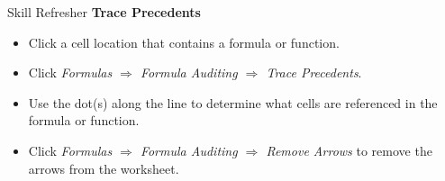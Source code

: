 \begin{center}
	\begin{sklbox}{Skill Refresher}
		\textbf{Trace Precedents}
		\\
		\begin{itemize}
			\setlength{\itemsep}{0pt}
			\setlength{\parskip}{0pt}
			\setlength{\parsep}{0pt}
			
			\item Click a cell location that contains a formula or function.
			\item Click \textit{Formulas $ \Rightarrow $ Formula Auditing $ \Rightarrow $ Trace Precedents}.
			\item Use the dot(s) along the line to determine what cells are referenced in the formula or function.
			\item Click \textit{Formulas $ \Rightarrow $ Formula Auditing $ \Rightarrow $ Remove Arrows} to remove the arrows from the worksheet.
			
		\end{itemize}
	\end{sklbox}
\end{center}


